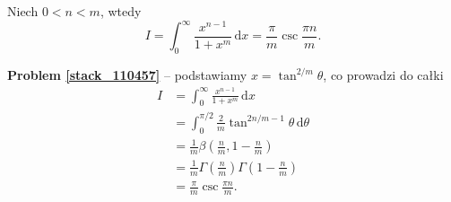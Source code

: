 %

\begin{problem_with_solution}[pytanie 110457]
    \label{stack_110457}%
    Niech $0 < n < m$, wtedy
    \begin{equation}
        I = \int_0^\infty \frac{x^{n-1}}{1 + x^m} \,\mathrm{d} x = \frac \pi m \operatorname{csc} \frac {\pi n}{m}.
    \end{equation}
\end{problem_with_solution}

\textbf{Problem \ref{stack_110457}} -- podstawiamy $x = \tan^{2/m} \theta$, co prowadzi do całki
\begin{align}
    I & = \int_0^\infty \frac{x^{n-1}}{1 + x^m} \,\mathrm{d} x \\
      & = \int_0^{\pi/2} \frac 2 m \tan^{2n/m - 1} \theta \,\mathrm{d}\theta \\
      & = \frac 1 m \beta\left( \frac nm, 1 - \frac nm \right) \\
      & = \frac 1 m \Gamma \left(\frac nm\right) \Gamma \left(1 - \frac nm\right) \\
      & = \frac \pi m \operatorname{csc} \frac {\pi n}{m}.
\end{align}

%